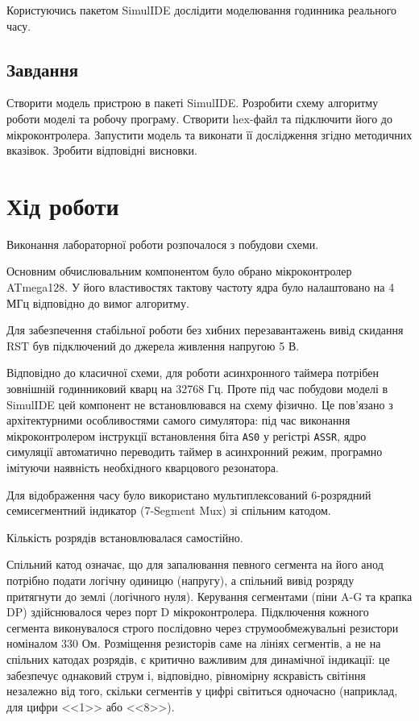\documentclass[14pt, a4paper]{extreport}
\begin{document}
	Користуючись пакетом SimulIDE дослідити моделювання годинника реального часу.
	
	\subsection*{Завдання}
	
	Створити модель пристрою в пакеті SimulIDE. Розробити схему алгоритму роботи моделі та робочу програму. Створити hex-файл та підключити його до мікроконтролера. Запустити модель та виконати її дослідження згідно методичних вказівок. Зробити відповідні висновки.
	
	\section*{Хід роботи}
	
	Виконання лабораторної роботи розпочалося з побудови схеми. 
	
	
	Основним обчислювальним компонентом було обрано мікроконтролер ATmega128. У його властивостях тактову частоту ядра було налаштовано на 4 МГц відповідно до вимог алгоритму. 
	
	
	Для забезпечення стабільної роботи без хибних перезавантажень вивід скидання RST був підключений до джерела живлення напругою 5 В.
	
	Відповідно до класичної схеми, для роботи асинхронного таймера потрібен зовнішній годинниковий кварц на 32768 Гц. Проте під час побудови моделі в SimulIDE цей компонент не встановлювався на схему фізично. Це пов'язано з архітектурними особливостями самого симулятора: під час виконання мікроконтролером інструкції встановлення біта \texttt{AS0} у регістрі \texttt{ASSR}, ядро симуляції автоматично переводить таймер в асинхронний режим, програмно імітуючи наявність необхідного кварцового резонатора.
	
	Для відображення часу було використано мультиплексований 6-розрядний семисегментний індикатор (7-Segment Mux) зі спільним катодом. 
	
	
	Кількість розрядів встановлювалася самостійно.
	
	
	Спільний катод означає, що для запалювання певного сегмента на його анод потрібно подати логічну одиницю (напругу), а спільний вивід розряду притягнути до землі (логічного нуля). Керування сегментами (піни A-G та крапка DP) здійснювалося через порт D мікроконтролера. Підключення кожного сегмента виконувалося строго послідовно через струмообмежувальні резистори номіналом 330 Ом. Розміщення резисторів саме на лініях сегментів, а не на спільних катодах розрядів, є критично важливим для динамічної індикації: це забезпечує однаковий струм і, відповідно, рівномірну яскравість світіння незалежно від того, скільки сегментів у цифрі світиться одночасно (наприклад, для цифри <<1>> або <<8>>).
	
\end{document}

